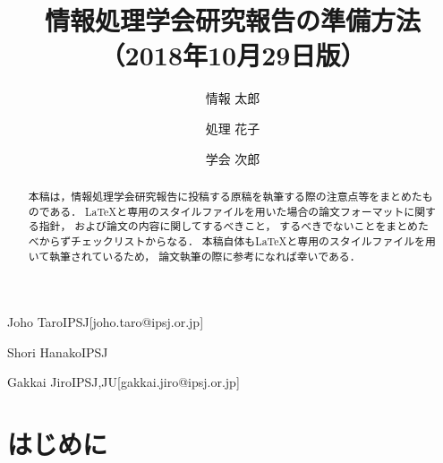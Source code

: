 \documentclass[submit,ses,noauthor]{ipsj-lualatex}
\begin{document}
\title{情報処理学会研究報告の準備方法\\
（2018年10月29日版）}





\author{情報 太郎}{Joho Taro}{IPSJ}[joho.taro@ipsj.or.jp]
\author{処理 花子}{Shori Hanako}{IPSJ}
\author{学会 次郎}{Gakkai Jiro}{IPSJ,JU}[gakkai.jiro@ipsj.or.jp]

\begin{abstract}
本稿は，情報処理学会研究報告に投稿する原稿を執筆する際の注意点等をまとめたものである．
\LaTeX と専用のスタイルファイルを用いた場合の論文フォーマットに関する指針，
および論文の内容に関してするべきこと，
するべきでないことをまとめたべからずチェックリストからなる．
本稿自体も\LaTeX と専用のスタイルファイルを用いて執筆されているため，
論文執筆の際に参考になれば幸いである．
\end{abstract}


%
%
%

\maketitle

\section{はじめに}
\end{document}
